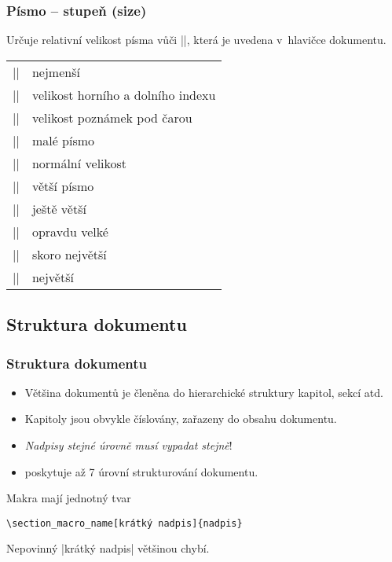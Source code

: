 \begin{frame}[fragile]
	\frametitle{Písmo -- stupeň (size)}
	Určuje relativní velikost písma vůči |\normalsize|, která je uvedena v~hlavičce dokumentu.
	\begin{center}
		\begin{tabular}{cl}
			|\tiny| & {\tiny{}nejmenší}\\
			|\scriptsize| & {\scriptsize{}velikost horního a dolního indexu}\\
			|\footnotesize| & {\footnotesize{}velikost poznámek pod čarou}\\
			|\small| & {\small{}malé písmo}\\
			|\normalsize| & {\normalsize{}normální velikost}\\
			|\large| & {\large{}větší písmo}\\
			|\Large| & {\Large{}ještě větší}\\
			|\LARGE| & {\LARGE{}opravdu velké}\\
			|\huge| & {\huge{}skoro největší}\\
			|\Huge| & {\Huge{}největší}\\
		\end{tabular}
	\end{center}
\end{frame}


\subsection{Struktura dokumentu}
\begin{frame}[fragile]
	\frametitle{Struktura dokumentu}
	\begin{itemize}
		\item Většina dokumentů je členěna do hierarchické struktury kapitol, sekcí atd.
		\item Kapitoly jsou obvykle číslovány, zařazeny do obsahu dokumentu.
		\item \emph{Nadpisy stejné úrovně musí vypadat stejně}!
		\item {} poskytuje až 7 úrovní strukturování dokumentu.
	\end{itemize}
	Makra mají jednotný tvar
	\begin{Verbatim}
\section_macro_name[krátký nadpis]{nadpis}
	\end{Verbatim}
	Nepovinný |krátký nadpis| většinou chybí.
\end{frame}


